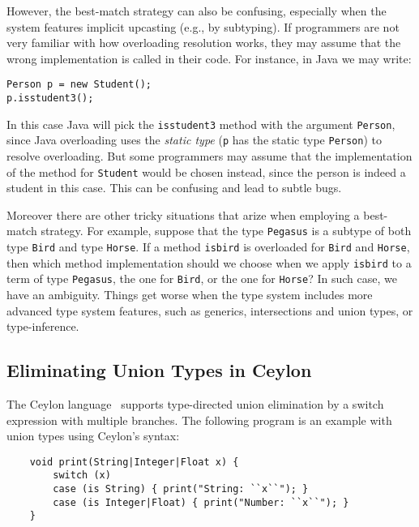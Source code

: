 However, the best-match strategy can also be confusing, especially when the
system features implicit upcasting (e.g., by subtyping). If programmers
are not very familiar with how overloading resolution works, they may assume
that the wrong implementation is called in their code. For instance, in Java
we may write:

\begin{lstlisting}
Person p = new Student();
p.isstudent3();
\end{lstlisting}

\noindent In this case Java will pick the \lstinline{isstudent3} method with the
argument \lstinline{Person}, since Java overloading uses the \emph{static type}
(\lstinline{p} has the static type \lstinline{Person})
to resolve overloading. But some programmers may assume that the implementation
of the method for \lstinline{Student} would be chosen instead, since the person
is indeed a student in this case. This can be confusing and lead to subtle bugs.

Moreover there are other tricky situations
that arize when employing a best-match strategy. For example, suppose
that the type \lstinline{Pegasus} is a subtype of both type \lstinline{Bird} and type
\lstinline{Horse}. If a method \lstinline{isbird} is overloaded for
\lstinline{Bird} and \lstinline{Horse}, then which method implementation should
we choose when we apply \lstinline{isbird} to a term of type
\lstinline{Pegasus}, the one for \lstinline{Bird}, or the one for
\lstinline{Horse}? In such case, we have an ambiguity. Things get worse
when the type system includes more advanced type system features, such as generics,
intersections and union types,
or type-inference.




\subsection{Eliminating Union Types in Ceylon}

The Ceylon language~\cite{} supports type-directed union elimination by a
switch expression with multiple branches. The following program is an example
with union types using Ceylon's syntax:

\begin{lstlisting}
	void print(String|Integer|Float x) {
		switch (x)
		case (is String) { print("String: ``x``"); }
		case (is Integer|Float) { print("Number: ``x``"); }
	}
\end{lstlisting}
%

